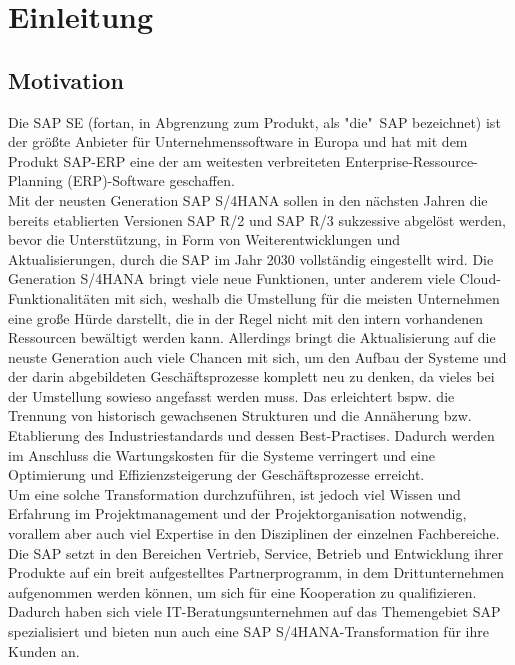 \section{Einleitung}
\subsection{Motivation}
Die SAP SE (fortan, in Abgrenzung zum Produkt, als "die"\ SAP bezeichnet) ist der größte Anbieter für Unternehmenssoftware in Europa und hat mit dem Produkt SAP-ERP eine der am weitesten verbreiteten Enterprise-Ressource-Planning (ERP)-Software geschaffen. \\Mit der neusten Generation SAP S/4HANA sollen in den nächsten Jahren die bereits etablierten Versionen SAP R/2 und SAP R/3 sukzessive abgelöst werden, bevor die Unterstützung, in Form von Weiterentwicklungen und Aktualisierungen, durch die SAP im Jahr 2030 vollständig eingestellt wird. Die Generation S/4HANA bringt viele neue Funktionen, unter anderem viele Cloud-Funktionalitäten mit sich, weshalb die Umstellung für die meisten Unternehmen eine große Hürde darstellt, die in der Regel nicht mit den intern vorhandenen Ressourcen bewältigt werden kann. Allerdings bringt die Aktualisierung auf die neuste Generation auch viele Chancen mit sich, um den Aufbau der Systeme und der darin abgebildeten Geschäftsprozesse komplett neu zu denken, 
da vieles bei der Umstellung sowieso angefasst werden muss. Das erleichtert bspw. die Trennung von historisch gewachsenen Strukturen und die Annäherung bzw. Etablierung des Industriestandards und dessen Best-Practises. Dadurch werden im Anschluss die Wartungskosten für die Systeme verringert und eine Optimierung und Effizienzsteigerung der Geschäftsprozesse erreicht.\\ Um eine solche Transformation durchzuführen, ist jedoch viel Wissen und Erfahrung im Projektmanagement und der Projektorganisation notwendig, vorallem aber auch viel Expertise in den Disziplinen der einzelnen Fachbereiche.
Die SAP setzt in den Bereichen Vertrieb, Service, Betrieb und  Entwicklung ihrer Produkte auf ein breit aufgestelltes Partnerprogramm, in dem Drittunternehmen aufgenommen werden können, um sich für eine Kooperation zu qualifizieren. Dadurch haben sich viele IT-Beratungsunternehmen auf das Themengebiet SAP spezialisiert und bieten nun auch eine SAP S/4HANA-Transformation für ihre Kunden an.

